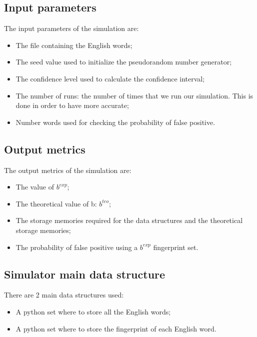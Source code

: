 \documentclass[twocolumn,letterpaper]{report}
\begin{document}
{				\subsection{Input parameters}
					The input parameters of the simulation are:
					\begin{itemize}
						\item The file containing the English words;
						\item The seed value used to initialize the pseudorandom number generator;
						\item The confidence level used to calculate the confidence interval;
						\item The number of runs: the number of times that we run our simulation. This is done in order to have more accurate;
						\item Number words used for checking the probability of false positive.
					\end{itemize}
					 
				\subsection{Output metrics}
					The output metrics of the simulation are:
					\begin{itemize}
							\item The value of $b^{exp}$;
							\item The theoretical value of b: $b^{teo}$;
							\item The storage  memories required for the data structures and the theoretical storage memories;
							\item The probability of false positive using a  $b^{exp}$ fingerprint set.
					\end{itemize}
			
			\subsection{Simulator main data structure}
						There are 2 main data structures used: 
							\begin{itemize}
								\item A python set where to store all the English words;
								\item A python set where to store the fingerprint of each English word.
								\end{itemize}
					
}
\end{document}
